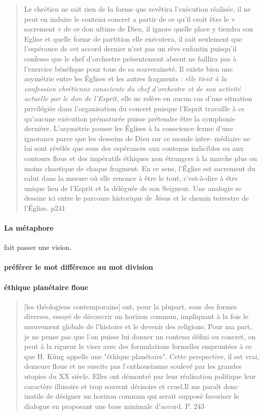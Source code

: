 \begin{quote}

Le chrétien ne sait rien de la forme que revêtira l'exécution réalisée, il ne peut en induire le contenu concret a partir de ce qu'il croit être le « sacrement » de ce don ultime de Dieu, il ignore quelle place y tiendra son Eglise et quelle forme de partition elle exécutera, il sait seulement que l'espérance de cet accord dernier n'est pas un rêve enfantin puisqu'il confesse que le chef d'orchestre présentement absent ne faillira pas à l'exercice bénéfique pour tous de sa souveraineté. Il existe bien une asymétrie entre les Églises et les autres fragments : \textit{elle tient à la confession chrétienne consciente du chef d'orchestre et de son activité actuelle par le don de l'Esprit,} elle ne relève en aucun cas d'une situation privilégiée dans l'organisation du concert puisque l'Esprit travaille à ce qu'aucune exécution prématurée puisse prétendre être la symphonie dernière.
L'asymétrie pousse les Églises à la conscience ferme d'une ignorance parce que les desseins de Dieu sur ce monde inter- médiaire ne lui sont révélés que sous des espérances aux contenus indicibles ou aux contours flous et des impératifs éthiques non étrangers à la marche plus ou moins chaotique de chaque fragment. En ce sens, l'Église est sacrement du salut dans la mesure où elle renonce à être le tout, c'est-à-dire à étre unique lieu de l'Esprit et la déléguée de son Seigneur. Une analogie se dessine ici entre le parcours historique de Jésus et le chemin terrestre de l'Église.
p241

\end{quote}
\paragraph{La métaphore} fait passer une vision. 


\paragraph{préférer le mot différence au mot division}

\paragraph{éthique planétaire floue}

\begin{quote}
    [les théologiens contemporains] ont, pour la plupart, sous des formes diverses, essayé de découvrir un horizon commun, impliquant à la fois le mouvement globale de l'histoire et le devenir des religions; Pour ma part, je ne pense pas que l'on puisse lui donner un contenu défini ou concret, on peut à la rigueur le viser avec des formulations formelles empruntées à ce que H. Küng appelle une "éthique planétaire". Cette perspective, il est vrai, demeure floue et ne suscite pas l'enthousiasme soulevé par les grandes utopies du XX siècle. Elles ont démontré par leur réalisation politique leur caractère illusoire et trop souvent dérisoire et cruel.Il me paraît donc inutile de désigner un horizon commun qui serait supposé favoriser le dialogue en proposant une base minimale d'accord. P. 243
\end{quote}
